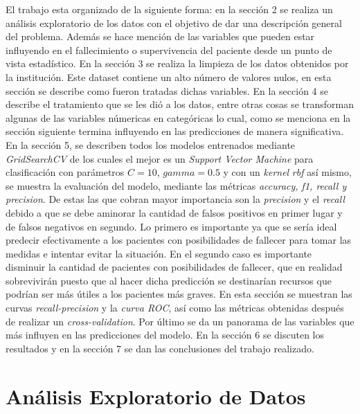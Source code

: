 \documentclass[6pt, twocolumn]{article}
\begin{document}
El trabajo esta organizado de la siguiente forma: en la sección 2 se realiza un análisis exploratorio de los datos  con el objetivo de dar una descripción general del problema. Además se hace mención de las variables que pueden estar influyendo en el fallecimiento o supervivencia del paciente desde un punto de vista estadístico. En la sección 3 se realiza la limpieza de los datos obtenidos por la institución. Este dataset contiene un alto número de valores nulos, en esta sección se describe como fueron tratadas dichas variables. En la sección 4 se describe el tratamiento que se les dió a los datos, entre otras cosas se transforman algunas de las variables númericas en categóricas lo cual, como se menciona en la sección siguiente termina influyendo en las predicciones de manera significativa. En la sección 5, se describen todos los modelos entrenados mediante \textit{GridSearchCV} de los cuales el mejor es un \textit{Support Vector Machine} para clasificación con parámetros $C = 10$, $gamma = 0.5$ y con un \textit{kernel} \textit{rbf} así mismo, se muestra la evaluación del modelo, mediante las métricas \textit{accuracy, f1, recall y precision}. De estas las que cobran mayor importancia son la \textit{precision} y el \textit{recall} debido a que se debe aminorar la cantidad de falsos positivos en primer lugar y de falsos negativos en segundo. Lo primero es importante ya que se sería ideal predecir efectivamente a los pacientes con posibilidades de fallecer para tomar las medidas e intentar evitar la situación. En el segundo caso es importante disminuir la cantidad de pacientes con posibilidades de fallecer, que en realidad sobrevivirán puesto que al hacer dicha predicción se destinarían recursos que podrían ser más útiles a los pacientes más graves. En esta sección se muestran las curvas \textit{recall-precision} y la \textit{curva ROC}, así como las métricas obtenidas después de realizar un \textit{cross-validation}. Por último se da un panorama de las variables que más influyen en las predicciones del modelo. En la sección 6 se discuten los resultados y en la sección 7 se dan las conclusiones del trabajo realizado.


\section{Análisis Exploratorio de Datos}
\end{document}
